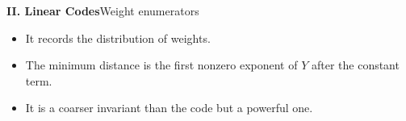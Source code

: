 %

\begin{frame}{\textbf{II. Linear Codes}}{Weight enumerators}
\small
{}
\begin{itemize}
  \item It records the distribution of weights.
  \item The minimum distance is the first nonzero exponent of $Y$ after the constant term.
  \item It is a coarser invariant than the code but a powerful one.
\end{itemize}
\end{frame}

